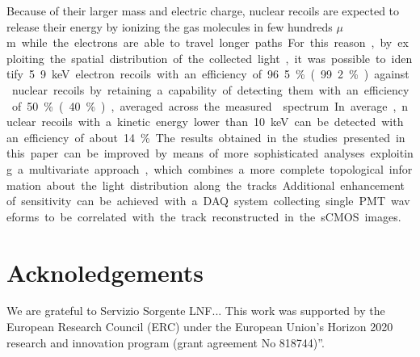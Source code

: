 \documentclass[12pt]{iopart}
\begin{document}
Because of their larger mass and electric charge, nuclear recoils are
expected to release their energy by ionizing the gas molecules in few
hundreds \unit{$\mu$m} while the electrons are able to travel longer
paths. For this reason, by exploiting the spatial distribution of the
collected light, it was possible to identify 5.9\keV electron recoils
with an efficiency of 96.5\% (99.2\%) against nuclear recoils by
retaining a capability of detecting them with an efficiency of 50\%
(40\%), averaged across the measured \ambe spectrum.

In average, nuclear recoils with a kinetic energy lower than 10\keV
can be detected with an efficiency of about 14\%.

The results obtained in the studies presented in this paper can be
improved by means of more sophisticated analyses exploiting a
multivariate approach, which combines a more complete topological
information about the light distribution along the tracks.  Additional
enhancement of sensitivity can be achieved with a DAQ system
collecting single PMT waveforms to be correlated with the track
reconstructed in the sCMOS images.

\section{Acknoledgements}
We are grateful to Servizio Sorgente LNF...  This work was supported
by the European Research Council (ERC) under the European Union’s
Horizon 2020 research and innovation program (grant agreement No
818744)”.



\end{document}

